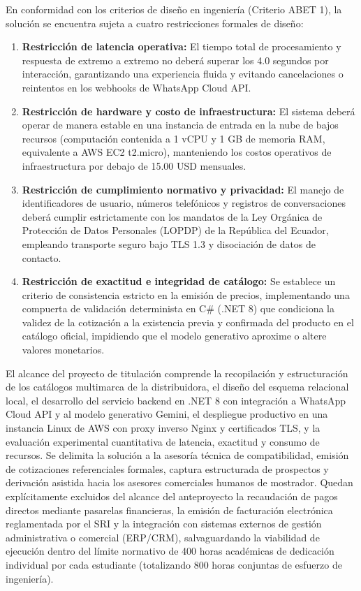 En conformidad con los criterios de diseño en ingeniería (Criterio ABET 1), la solución se encuentra sujeta a cuatro restricciones formales de diseño:
\begin{enumerate}
    \item \textbf{Restricción de latencia operativa:} El tiempo total de procesamiento y respuesta de extremo a extremo no deberá superar los 4.0 segundos por interacción, garantizando una experiencia fluida y evitando cancelaciones o reintentos en los webhooks de WhatsApp Cloud API.
    \item \textbf{Restricción de hardware y costo de infraestructura:} El sistema deberá operar de manera estable en una instancia de entrada en la nube de bajos recursos (computación contenida a 1 vCPU y 1 GB de memoria RAM, equivalente a AWS EC2 t2.micro), manteniendo los costos operativos de infraestructura por debajo de 15.00 USD mensuales.
    \item \textbf{Restricción de cumplimiento normativo y privacidad:} El manejo de identificadores de usuario, números telefónicos y registros de conversaciones deberá cumplir estrictamente con los mandatos de la Ley Orgánica de Protección de Datos Personales (LOPDP) de la República del Ecuador, empleando transporte seguro bajo TLS 1.3 y disociación de datos de contacto.
    \item \textbf{Restricción de exactitud e integridad de catálogo:} Se establece un criterio de consistencia estricto en la emisión de precios, implementando una compuerta de validación determinista en C\# (.NET 8) que condiciona la validez de la cotización a la existencia previa y confirmada del producto en el catálogo oficial, impidiendo que el modelo generativo aproxime o altere valores monetarios.
\end{enumerate}

El alcance del proyecto de titulación comprende la recopilación y estructuración de los catálogos multimarca de la distribuidora, el diseño del esquema relacional local, el desarrollo del servicio backend en .NET 8 con integración a WhatsApp Cloud API y al modelo generativo Gemini, el despliegue productivo en una instancia Linux de AWS con proxy inverso Nginx y certificados TLS, y la evaluación experimental cuantitativa de latencia, exactitud y consumo de recursos. Se delimita la solución a la asesoría técnica de compatibilidad, emisión de cotizaciones referenciales formales, captura estructurada de prospectos y derivación asistida hacia los asesores comerciales humanos de mostrador. Quedan explícitamente excluidos del alcance del anteproyecto la recaudación de pagos directos mediante pasarelas financieras, la emisión de facturación electrónica reglamentada por el SRI y la integración con sistemas externos de gestión administrativa o comercial (ERP/CRM), salvaguardando la viabilidad de ejecución dentro del límite normativo de 400 horas académicas de dedicación individual por cada estudiante (totalizando 800 horas conjuntas de esfuerzo de ingeniería).
